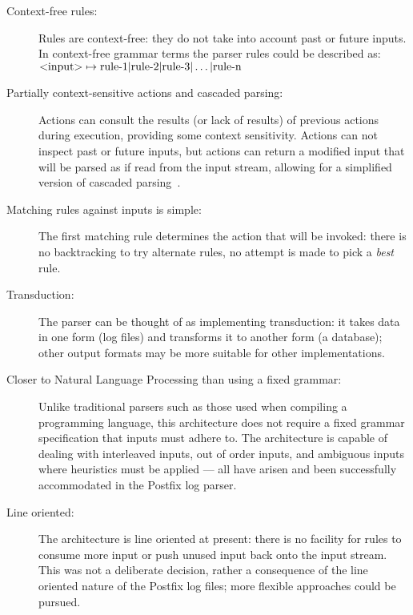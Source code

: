 \documentclass{svmult}
\begin{document}
\begin{description}

    \item [Context-free rules:]  Rules are context-free: they do not take
        into account past or future inputs.  In context-free grammar terms
        the parser rules could be described as:
        $\text{\textless{}input\textgreater{}} \mapsto \text{rule-1} |
        \text{rule-2} | \text{rule-3} | \dots | \text{rule-n}$

    \item [Partially context-sensitive actions and cascaded parsing:]
        Actions can consult the results (or lack of results) of previous
        actions during execution, providing some context sensitivity.
        Actions can not inspect past or future inputs, but actions can
        return a modified input that will be parsed as if read from the
        input stream, allowing for a simplified version of cascaded
        parsing~\cite{cascaded-parsing}.

    \item [Matching rules against inputs is simple:]  The first matching
        rule determines the action that will be invoked: there is no
        backtracking to try alternate rules, no attempt is made to pick a
        \textit{best\/} rule.

    \item [Transduction:]  The parser can be thought of as implementing
        transduction: it takes data in one form (log files) and transforms
        it to another form (a database); other output formats may be more
        suitable for other implementations.

    \item [Closer to Natural Language Processing than using a fixed
        grammar:] Unlike traditional parsers such as those used when
        compiling a programming language, this architecture does not
        require a fixed grammar specification that inputs must adhere to.
        The architecture is capable of dealing with interleaved inputs, out
        of order inputs, and ambiguous inputs where heuristics must be
        applied --- all have arisen and been successfully accommodated in
        the Postfix log parser.

    \item [Line oriented:]  The architecture is line oriented at present:
        there is no facility for rules to consume more input or push unused
        input back onto the input stream.  This was not a deliberate
        decision, rather a consequence of the line oriented nature of the
        Postfix log files; more flexible approaches could be pursued.

\end{description}
\end{document}
